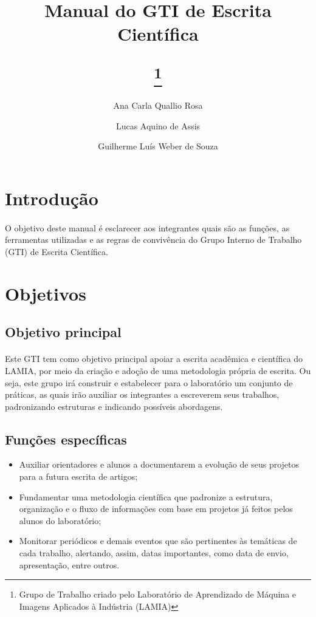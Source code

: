 \documentclass{article}
\title{Manual do GTI de Escrita Científica 
	\author{
		Ana Carla Quallio Rosa
		\and
		Lucas Aquino de Assis
		\and
		Guilherme Luís Weber de Souza
	}
	\thanks{Grupo de Trabalho criado pelo Laboratório de Aprendizado de Máquina e Imagens Aplicados à Indústria (LAMIA)}
}
\begin{document}
\begin{titlepage}
\maketitle
\end{titlepage}
\newpage
\tableofcontents
\newpage
\section*{Introdução}
\paragraph{}
O objetivo deste manual é esclarecer aos integrantes quais são as funções, as ferramentas utilizadas e as regras de convivência do Grupo Interno de Trabalho (GTI) de Escrita Científica.

\section{Objetivos}
\subsection{Objetivo principal}
\paragraph{}
Este GTI tem como objetivo principal apoiar a escrita acadêmica e científica do LAMIA, por meio da criação e adoção de uma metodologia própria de escrita. Ou seja, este grupo irá construir e estabelecer para o laboratório um conjunto de práticas, as quais irão auxiliar os integrantes a escreverem seus trabalhos, padronizando estruturas e indicando possíveis abordagens. 

\subsection{Funções específicas}
\begin{itemize}
  \item Auxiliar orientadores e alunos a documentarem a evolução de seus projetos para a futura escrita de artigos;
  \item Fundamentar uma metodologia científica que padronize a estrutura, organização e o fluxo de informações com base em projetos já feitos pelos alunos do laboratório;
  \item Monitorar periódicos e demais eventos que são pertinentes às temáticas de cada trabalho, alertando, assim, datas importantes, como data de envio, apresentação, entre outros.
\end{itemize}
\end{document}
